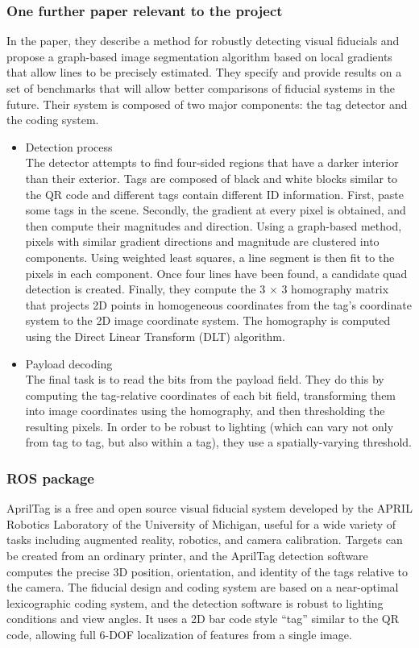 \documentclass[12pt,draftclsnofoot,onecolumn]{IEEEtran}
\begin{document}
	\subsubsection{One further paper relevant to the project}
	In the paper\cite{olson2011apriltag}, they describe a method for robustly detecting visual fiducials and propose a graph-based image segmentation algorithm based on local gradients that allow lines to be precisely estimated. They specify and provide results on a set of benchmarks that will allow better comparisons of fiducial systems in the future. Their system is composed of two major components: the tag detector and the coding system.  
	\begin{itemize}
		\item Detection process\\
		The detector attempts to find four-sided regions that have a darker interior than their exterior. Tags are composed of black and white blocks similar to the QR code and different tags contain different ID information. First, paste some tags in the scene. Secondly, the gradient at every pixel is obtained, and then compute their magnitudes and direction. Using a graph-based method, pixels with similar gradient directions and magnitude are clustered into components. Using weighted least squares, a line segment is then fit to the pixels in each component. Once four lines have been found, a candidate quad detection is created. Finally, they compute the 3 $\times$ 3 homography matrix that projects 2D points in homogeneous coordinates from the tag’s coordinate system to the 2D image coordinate system. The homography is computed using the Direct Linear Transform (DLT) algorithm.
		\item Payload decoding\\ 
		The final task is to read the bits from the payload field. They do this by computing the tag-relative coordinates of each bit field, transforming them into image coordinates using the homography, and then thresholding the resulting pixels. In order to be robust to lighting (which can vary not only from tag to tag, but also within a tag), they use a spatially-varying threshold.
	\end{itemize}
	
	\subsubsection{ROS package}
	AprilTag is a free and open source visual fiducial system developed by the APRIL Robotics Laboratory of the University of Michigan, useful for a wide variety of tasks including augmented reality, robotics, and camera calibration. Targets can be created from an ordinary printer, and the AprilTag detection software computes the precise 3D position, orientation, and identity of the tags relative to the camera. The fiducial design and coding system are based on a near-optimal lexicographic coding system, and the detection software is robust to lighting conditions and view angles. 
	It uses a 2D bar code style “tag” similar to the QR code, allowing full 6-DOF localization of features from a single image.
	
\end{document}
